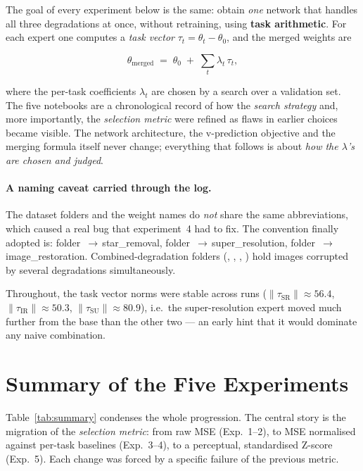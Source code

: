 The goal of every experiment below is the same: obtain \emph{one} network that
handles all three degradations at once, without retraining, using
\textbf{task arithmetic}. For each expert one computes a \emph{task vector}
$\tau_t=\theta_t-\theta_0$, and the merged weights are

\[
\theta_{\mathrm{merged}} \;=\; \theta_0 \;+\; \sum_{t}\lambda_t\,\tau_t ,
\]

where the per-task coefficients $\lambda_t$ are chosen by a search over a
validation set. The five notebooks are a chronological record of how the
\emph{search strategy} and, more importantly, the \emph{selection metric}
were refined as flaws in earlier choices became visible. The network
architecture, the v-prediction objective and the merging formula itself never
change; everything that follows is about \emph{how the $\lambda$'s are chosen
and judged}.

\paragraph{A naming caveat carried through the log.}
The dataset folders and the weight names do \emph{not} share the same
abbreviations, which caused a real bug that experiment~4 had to fix. The
convention finally adopted is: folder \,$\rightarrow$\,star\_removal,
folder \,$\rightarrow$\,super\_resolution, folder
\,$\rightarrow$\,image\_restoration. Combined-degradation folders
(, , , ) hold images
corrupted by several degradations simultaneously.

Throughout, the task vector norms were stable across runs
($\lVert\tau_{\mathrm{SR}}\rVert\!\approx\!56.4$,
$\lVert\tau_{\mathrm{IR}}\rVert\!\approx\!50.3$,
$\lVert\tau_{\mathrm{SU}}\rVert\!\approx\!80.9$), i.e.\ the super-resolution
expert moved much further from the base than the other two --- an early hint
that it would dominate any naive combination.

\section{Summary of the Five Experiments}

Table~\ref{tab:summary} condenses the whole progression. The central story is
the migration of the \emph{selection metric}: from raw MSE (Exp.~1--2), to
MSE normalised against per-task baselines (Exp.~3--4), to a perceptual,
standardised Z-score (Exp.~5). Each change was forced by a specific failure of
the previous metric.

